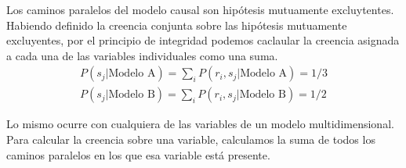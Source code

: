 \documentclass[a4paper,10pt]{book}
\theoremstyle{definition}
\begin{document}

Los caminos paralelos del modelo causal son hip\'otesis mutuamente excluytentes.
%
% 
% 
Habiendo definido la creencia conjunta sobre las hip\'otesis mutuamente excluyentes, por el principio de integridad podemos caclaular la creencia asignada a cada una de las variables individuales como una suma.
%
\begin{equation}
\begin{split}
P(s_j|\text{Modelo A}) = \sum_i P(r_i, s_j|\text{Modelo A}) = 1/3 \\  P(s_j|\text{Modelo B}) = \sum_i P(r_i, s_j|\text{Modelo B}) = 1/2
\end{split}
\end{equation}


Lo mismo ocurre con cualquiera de las variables de un modelo multidimensional.
Para calcular la creencia sobre una variable, calculamos la suma de todos los caminos paralelos en los que esa variable est\'a presente.
\end{document}
